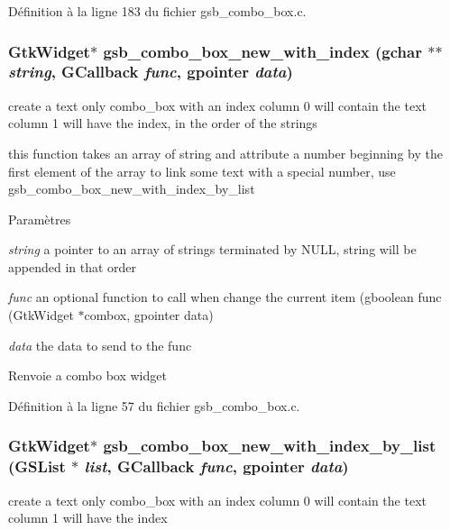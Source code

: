 Définition à la ligne 183 du fichier gsb\_\-combo\_\-box.c.

\subsubsection[{gsb\_\-combo\_\-box\_\-new\_\-with\_\-index}]{\setlength{\rightskip}{0pt plus 5cm}GtkWidget$\ast$ gsb\_\-combo\_\-box\_\-new\_\-with\_\-index (gchar $\ast$$\ast$ {\em string}, \/  GCallback {\em func}, \/  gpointer {\em data})}\label{gsb__combo__box_8h_a23f4b26bf92de4ed5e6997ab265b3bdc}
create a text only combo\_\-box with an index column 0 will contain the text column 1 will have the index, in the order of the strings

this function takes an array of string and attribute a number beginning by the first element of the array to link some text with a special number, use gsb\_\-combo\_\-box\_\-new\_\-with\_\-index\_\-by\_\-list


\begin{DoxyParams}{Paramètres}
\item[{\em string}]a pointer to an array of strings terminated by NULL, string will be appended in that order \item[{\em func}]an optional function to call when change the current item (gboolean func (GtkWidget $\ast$combox, gpointer data) \item[{\em data}]the data to send to the func\end{DoxyParams}
\begin{DoxyReturn}{Renvoie}
a combo box widget 
\end{DoxyReturn}


Définition à la ligne 57 du fichier gsb\_\-combo\_\-box.c.

\subsubsection[{gsb\_\-combo\_\-box\_\-new\_\-with\_\-index\_\-by\_\-list}]{\setlength{\rightskip}{0pt plus 5cm}GtkWidget$\ast$ gsb\_\-combo\_\-box\_\-new\_\-with\_\-index\_\-by\_\-list (GSList $\ast$ {\em list}, \/  GCallback {\em func}, \/  gpointer {\em data})}\label{gsb__combo__box_8h_aaa528158307654e8a321fbaaf07cd349}
create a text only combo\_\-box with an index column 0 will contain the text column 1 will have the index

